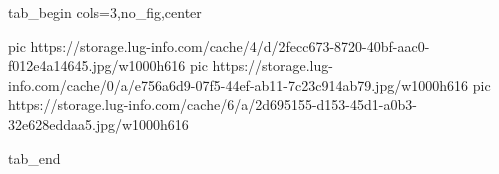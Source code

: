 
 
 
 
 


\ifcmt
  tab_begin cols=3,no_fig,center

     pic https://storage.lug-info.com/cache/4/d/2fecc673-8720-40bf-aac0-f012e4a14645.jpg/w1000h616%
		 pic https://storage.lug-info.com/cache/0/a/e756a6d9-07f5-44ef-ab11-7c23c914ab79.jpg/w1000h616%
		 pic https://storage.lug-info.com/cache/6/a/2d695155-d153-45d1-a0b3-32e628eddaa5.jpg/w1000h616%

  tab_end
\fi
